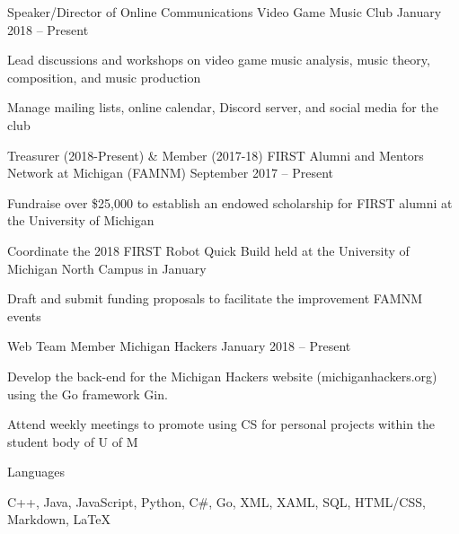\documentclass[]{awesome-cv}
\begin{document}
	\vspace{-5mm}

\vspace{-2mm}
\vspace{-2mm}
	\cventry
	{Speaker/Director of Online Communications}
	{Video Game Music Club}
	{}
	{January 2018 – Present}
	{\begin{cvitems}
		\item {Lead discussions and workshops on video game music analysis, music theory, composition, and music production}
		\item {Manage mailing lists, online calendar, Discord server, and social media for the club}
		\end{cvitems}}

	\vspace{-4mm}
	\cventry
	{Treasurer (2018-Present) \& Member (2017-18)}
	{FIRST Alumni and Mentors Network at Michigan (FAMNM)}
	{}
	{September 2017 – Present}
	{\begin{cvitems}
		\item {Fundraise over \$25,000 to establish an endowed scholarship for FIRST alumni at the University of Michigan}
		\item {Coordinate the 2018 FIRST Robot Quick Build held at the University of Michigan North Campus in January}
		\item {Draft and submit funding proposals to facilitate the improvement FAMNM events}
		\end{cvitems}}
	
	\vspace{-4mm}
	\cventry
	{Web Team Member}
	{Michigan Hackers}
	{}
	{January 2018 – Present}
	{\begin{cvitems}
		\item {Develop the back-end for the Michigan Hackers website (michiganhackers.org) using the Go framework Gin.}
		\item {Attend weekly meetings to promote using CS for personal projects within the student body of U of M}
		\end{cvitems}}
	\vspace{-4mm}

\vspace{-1mm}
\vspace{-2mm}
	\cventry
	{}
	{Languages}
	{}
	{}
	{\begin{cvitems}
		\vspace{-7mm}
		\item {C++, Java, JavaScript, Python, C\#, Go, XML, XAML, SQL, HTML/CSS, Markdown, LaTeX}
		\end{cvitems}}
\end{document}
